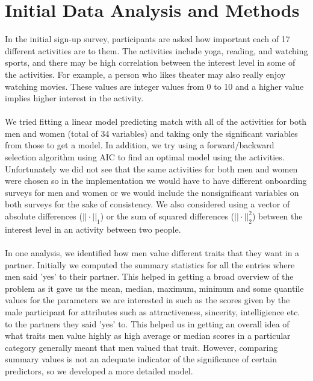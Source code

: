 \documentclass{article}
\begin{document}
\section{Initial Data Analysis and Methods}
In the initial sign-up survey, participants are asked how important each of 17 different activities are to them.  The activities include yoga, reading, and watching sports, and there may be high correlation between the interest level in some of the activities.  For example, a person who likes theater may also really enjoy watching movies.  These values are integer values from 0 to 10 and a higher value implies higher interest in the activity. \\ %
\null\\
We tried fitting a linear model predicting match with all of the activities for both men and women (total of 34 variables) and taking only the significant variables from those to get a model.  In addition, we try using a forward/backward selection algorithm using AIC to find an optimal model using the activities.  Unfortunately we did not see that the same activities for both men and women were chosen so in the implementation we would have to have different onboarding surveys for men and women or we would include the nonsignificant variables on both surveys for the sake of consistency.  We also considered using a vector of absolute differences ($||\cdot||_1$) or the sum of squared differences ($||\cdot||_2^2$) between the interest level in an activity between two people. \\
\null\\
In one analysis, we identified how men value different traits that they want in a partner. Initially we computed the summary statistics for all the entries where men said 'yes' to their partner. This helped in getting a broad overview of the problem as it gave us the mean, median, maximum, minimum and some quantile values for the parameters we are interested in such as the scores given by the male participant for attributes such as attractiveness, sincerity, intelligience etc. to the partners they said 'yes' to. This helped us in getting an overall idea of what traits men value highly as high average or median scores in a particular category generally meant that men valued that trait. However, comparing summary values is not an adequate indicator of the significance of certain predictors, so we developed a more detailed model. \\
\end{document}
